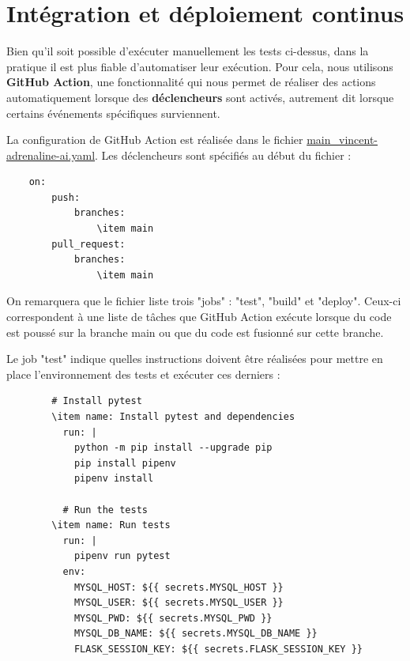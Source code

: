 \documentclass[french]{article}
\begin{document}
    \section{Intégration et déploiement continus}

    Bien qu'il soit possible d'exécuter manuellement les tests ci-dessus, dans la pratique il est plus fiable d'automatiser leur exécution. Pour cela, nous utilisons \textbf{GitHub Action}, une fonctionnalité qui nous permet de réaliser des actions automatiquement lorsque des \textbf{déclencheurs} sont activés, autrement dit lorsque certains événements spécifiques surviennent.

    La configuration de GitHub Action est réalisée dans le fichier \href{https://github.com/vinpap/adrenaline.ai/blob/main/.github/workflows/main_vincent-adrenaline-ai.yml}{main\_vincent-adrenaline-ai.yaml}. Les déclencheurs sont spécifiés au début du fichier :

    \begin{verbatim}
    on:
        push:
            branches:
                \item main
        pull_request:
            branches:
                \item main
    \end{verbatim}

    On remarquera que le fichier liste trois "jobs" : "test", "build" et "deploy". Ceux-ci correspondent à une liste de tâches que GitHub Action exécute lorsque du code est poussé sur la branche main ou que du code est fusionné sur cette branche. 

    Le job "test" indique quelles instructions doivent être réalisées pour mettre en place l'environnement des tests et exécuter ces derniers :

    \begin{verbatim}
        # Install pytest
        \item name: Install pytest and dependencies
          run: |
            python -m pip install --upgrade pip
            pip install pipenv
            pipenv install
  
          # Run the tests
        \item name: Run tests
          run: |
            pipenv run pytest
          env: 
            MYSQL_HOST: ${{ secrets.MYSQL_HOST }}
            MYSQL_USER: ${{ secrets.MYSQL_USER }}
            MYSQL_PWD: ${{ secrets.MYSQL_PWD }}
            MYSQL_DB_NAME: ${{ secrets.MYSQL_DB_NAME }}
            FLASK_SESSION_KEY: ${{ secrets.FLASK_SESSION_KEY }}
    \end{verbatim}
\end{document}
